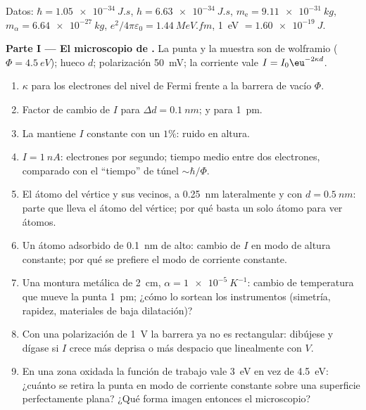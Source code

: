 \begin{problem}\label{pb:b2:potential-wells-tunneling:1}
Datos: $\hbar = \qty{1.05e-34}{J.s}$, $h = \qty{6.63e-34}{J.s}$, $m_{\text{e}} =
\qty{9.11e-31}{kg}$, $m_\alpha = \qty{6.64e-27}{kg}$, $e^2/4\pi\varepsilon_0 =
\qty{1.44}{MeV.fm}$, \qty{1}{eV} $= \qty{1.60e-19}{J}$.

\textbf{Parte I --- El microscopio de .}
La punta y la muestra son de wolframio ($\Phi = \qty{4.5}{eV}$); hueco $d$; polarización
\qty{50}{mV}; la corriente vale $I = I_0\eu^{-2\kappa d}$.
\begin{enumerate}
  \item $\kappa$ para los electrones del nivel de Fermi frente a la barrera de
        vacío $\Phi$.
  \item Factor de cambio de $I$ para $\Delta d = \qty{0.1}{nm}$; y para
        \qty{1}{pm}.
  \item La  mantiene $I$ constante con un $1\%$: ruido en altura.
  \item $I = \qty{1}{nA}$: electrones por segundo; tiempo medio entre dos
        electrones, comparado con el ``tiempo'' de túnel $\sim\hbar/\Phi$.
  \item El átomo del vértice y sus vecinos, a \qty{0.25}{nm} lateralmente y con
        $d = \qty{0.5}{nm}$: parte que lleva el átomo del vértice; por qué basta un solo átomo
        para ver átomos.
  \item Un átomo adsorbido de \qty{0.1}{nm} de alto: cambio de $I$ en
        modo de altura constante; por qué se prefiere el modo de corriente constante.
  \item Una montura metálica de \qty{2}{cm}, $\alpha = \qty{1e-5}{K^{-1}}$: cambio de
        temperatura que mueve la punta \qty{1}{pm}; ¿cómo lo sortean los instrumentos
        (simetría, rapidez, materiales de baja dilatación)?
  \item Con una polarización de \qty{1}{V} la barrera ya no es rectangular:
        dibújese y dígase si $I$ crece más deprisa o más despacio que
        linealmente con $V$.
  \item En una zona oxidada la función de trabajo vale \qty{3}{eV} en vez
        de \qty{4.5}{eV}: ¿cuánto se retira la punta en
        modo de corriente constante sobre una superficie perfectamente plana? ¿Qué
        forma imagen entonces el microscopio?
\end{enumerate}


\end{problem}
